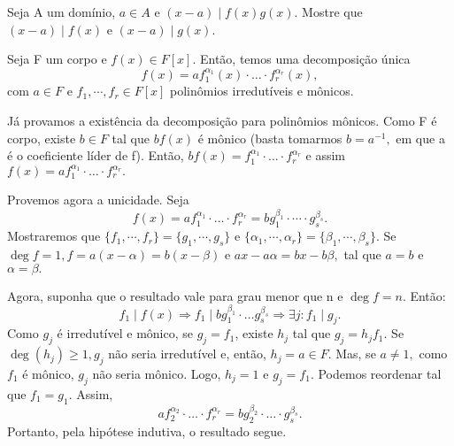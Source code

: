 \documentclass[AlgebraII/algebraII_notes.tex]{subfiles}
\begin{document}
\begin{example}[Exercício]
	Seja A um domínio, \(a\in A\) e \((x-a)\mid f(x)g(x).\) Mostre que \((x-a)\mid f(x)\) e \((x-a)\mid g(x).\)
\end{example}
\begin{prop*}
	Seja F um corpo e \(f(x)\in F[x]\). Então, temos uma decomposição única
	\[
		f(x) = af_{1}^{\alpha_{1}}(x)\cdot \dotsc \cdot f_{r}^{\alpha_{r}}(x),
	\]
	com \(a\in F\) e \(f_{1}, \cdots, f_{r}\in F[x]\) polinômios irredutíveis e mônicos.
\end{prop*}
\begin{proof*}
	Já provamos a existência da decomposição para polinômios mônicos. Como F é corpo, existe \(b\in F\) tal que
	\(bf(x)\) é mônico (basta tomarmos \(b=a^{-1},\) em que a é o coeficiente líder de f). Então, \(bf(x) = f_{1}^{\alpha_{1}}\cdot \dotsc \cdot f_{r}^{\alpha_{r}}\)
	e assim \(f(x) =af_{1}^{\alpha_{1}}\cdot \dotsc \cdot f_{r}^{\alpha_{r}}.\)

	Provemos agora a unicidade. Seja
	\[
		f(x)=af_{1}^{\alpha_{1}} \cdot \dotsc \cdot f_{r}^{\alpha_{r}} = bg_{1}^{\beta_{1}} \cdot \cdots \cdot g_{s}^{\beta_{s}}.
	\]
	Mostraremos que \(\{f_{1}, \cdots, f_{r}\} = \{g_{1}, \cdots, g_{s}\}\) e \(\{\alpha_{1}, \cdots, \alpha_{r}\} = \{\beta_{1}, \cdots, \beta_{s}\}\).
	Se \(\deg{f} = 1, f = a(x-\alpha ) = b(x-\beta )\) e \(ax -a\alpha =bx - b\beta,\) tal que \(a=b\) e \(\alpha =\beta .\)

	Agora, suponha que o resultado vale para grau menor que n e \(\deg{f} = n.\) Então:
	\[
		f_{1}\mid f(x) \Rightarrow f_{1}\mid bg_{1}^{\beta_{1}}\cdot \dotsc g_{s}^{\beta_{s}} \Rightarrow \exists j: f_{1}\mid g_{j}.
	\]
	Como \(g_{j}\) é irredutível e mônico, se \(g_{j}=f_{1}\), existe \(h_{j}\) tal que \(g_{j} = h_{j}f_{1}.\) Se \(\deg{(h_{j})}\geq 1, g_{j}\) não seria
	irredutível e, então, \(h_{j} = a\in F.\) Mas, se \(a\neq1,\) como \(f_{1}\) é mônico, \(g_{j}\) não seria mônico. Logo, \(h_{j} = 1\) e \(g_{j} = f_{1}.\)
	Podemos reordenar tal que \(f_{1} = g_{1}. \) Assim,
	\[
		af_{2}^{\alpha_{2}}\cdot \dotsc \cdot f_{r}^{\alpha_{r}} = bg_{2}^{\beta_{2}} \cdot \dotsc \cdot g_{s}^{\beta_{s}}.
	\]
	Portanto, pela hipótese indutiva, o resultado segue. \qedsymbol
\end{proof*}
\end{document}
